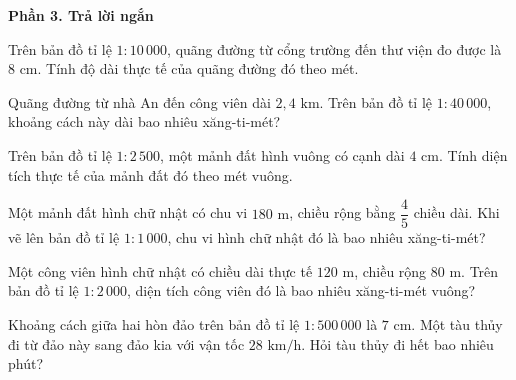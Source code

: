 \textbf{Phần 3. Trả lời ngắn}

\begin{ex} %
Trên bản đồ tỉ lệ $1 : 10\,000$, quãng đường từ cổng trường đến thư viện đo được là $8\text{ cm}$. Tính độ dài thực tế của quãng đường đó theo mét.
\end{ex}

\begin{ex} %
Quãng đường từ nhà An đến công viên dài $2{,}4\text{ km}$. Trên bản đồ tỉ lệ $1 : 40\,000$, khoảng cách này dài bao nhiêu xăng-ti-mét?
\end{ex}

\begin{ex} %
Trên bản đồ tỉ lệ $1 : 2\,500$, một mảnh đất hình vuông có cạnh dài $4\text{ cm}$. Tính diện tích thực tế của mảnh đất đó theo mét vuông.
\end{ex}

\begin{ex} %
Một mảnh đất hình chữ nhật có chu vi $180\text{ m}$, chiều rộng bằng $\dfrac{4}{5}$ chiều dài. Khi vẽ lên bản đồ tỉ lệ $1 : 1\,000$, chu vi hình chữ nhật đó là bao nhiêu xăng-ti-mét?
\end{ex}

\begin{ex} %
Một công viên hình chữ nhật có chiều dài thực tế $120\text{ m}$, chiều rộng $80\text{ m}$. Trên bản đồ tỉ lệ $1 : 2\,000$, diện tích công viên đó là bao nhiêu xăng-ti-mét vuông?
\end{ex}

\begin{ex} %
Khoảng cách giữa hai hòn đảo trên bản đồ tỉ lệ $1 : 500\,000$ là $7\text{ cm}$. Một tàu thủy đi từ đảo này sang đảo kia với vận tốc $28\text{ km/h}$. Hỏi tàu thủy đi hết bao nhiêu phút?
\end{ex}

